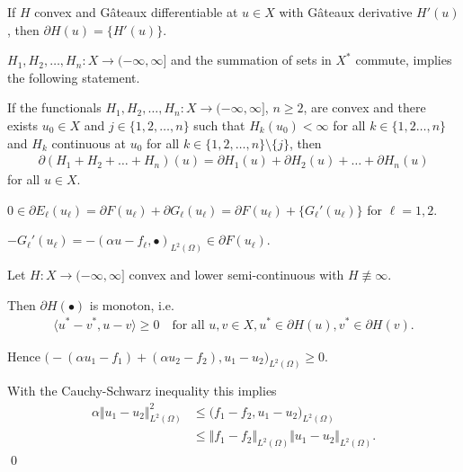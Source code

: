 \documentclass[xcolor=svgnames,english]{beamer}
\begin{document}
\begin{frame}
  \begin{block}{}
    If $H$ convex and G\^{a}teaux differentiable
    at $u\in X$ with G\^{a}teaux derivative $H'(u)$, then
    $\partial H(u)=\{H'(u)\}$.
  \end{block}

  \pause

  $H_1,H_2,\ldots,H_n:X\to (-\infty,\infty]$ and the summation of sets in
  $X^\ast$ commute,
  \cite[S. 389, Theorem 47.B]{Zei85} implies the following statement.
  \begin{block}{}
    If the functionals $H_1,H_2,\ldots,H_n: X\to
    (-\infty,\infty]$, $n\geq 2$, are convex and there exists 
    $u_0\in X$ and $j\in\{1,2,\ldots,n\}$ such that $H_k(u_0)<\infty$
    for all $k\in\{1,2\ldots,n\}$
    and $H_k$ continuous at $u_0$ for all $k\in\{1,2,\ldots,n\}\setminus\{j\}$,
    then
    \begin{align*}
      \partial (H_1+H_2+\ldots+ H_n)(u) 
      = \partial H_1(u)+\partial H_2(u)+ \ldots + \partial H_n(u)
    \end{align*}
    for all $u\in X$.
  \end{block}
  \pause
  \medskip
  $0\in\partial E_\ell(u_\ell)
  = \partial F(u_\ell)+\partial G_\ell(u_\ell)=\partial F(u_\ell)+
  \{G_\ell'(u_\ell)\}$ for $\ell=1,2$.
\end{frame}

\begin{frame}
  $-G_\ell'(u_\ell)=-(\alpha u-f_\ell ,\bullet)_{L^2(\Omega)}\in\partial
  F(u_\ell)$.
  
  \pause
  \begin{block}{}
    Let $H:X\to (-\infty,\infty]$ convex and lower semi-continuous with
    $H\nequiv\infty$.
    
    Then $\partial H(\bullet)$ is monoton, i.e.
  \begin{align*}
    \langle u^\ast-v^\ast,u-v\rangle\geq 0\quad \text{for all } u,v\in X, 
    u^\ast \in \partial H(u), v^\ast \in \partial H(v).
  \end{align*}
  \end{block}

  \pause
  \medskip
  Hence
  $ \big( -(\alpha u_1 - f_1) + (\alpha u_2 - f_2), u_1 -
  u_2\big)_{L^2(\Omega)} \geq 0.  $

  \pause
  \medskip
  With the Cauchy-Schwarz inequality this implies
  \begin{align*}
    \alpha \Vert u_1 - u_2 \Vert_{L^2(\Omega)}^2
    &\leq
    \big(f_1 -f_2, u_1-u_2 \big)_{L^2(\Omega)}\\
    &\leq
    \Vert f_1-f_2\Vert_{L^2(\Omega)}\Vert u_1 - u_2\Vert_{L^2(\Omega)}.
  \end{align*}
  \qed
\end{frame}
\end{document}
